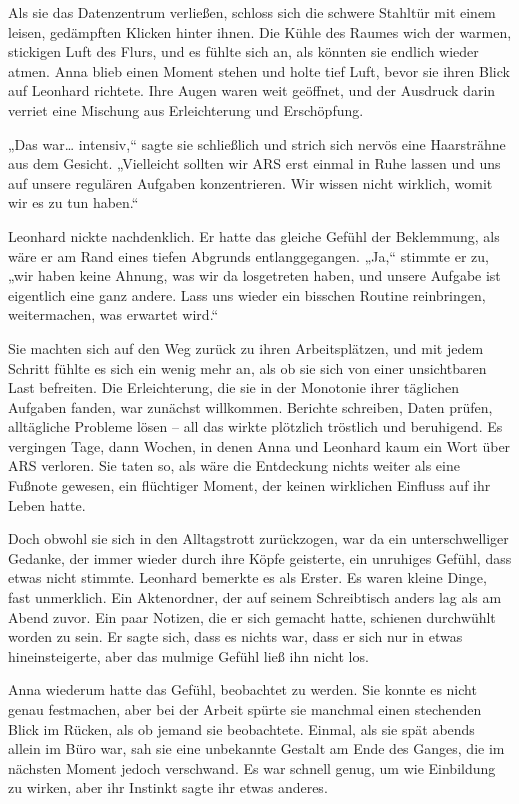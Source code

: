 \documentclass[
]{article}
\begin{document}
Als sie das Datenzentrum verließen, schloss sich die schwere Stahltür
mit einem leisen, gedämpften Klicken hinter ihnen. Die Kühle des Raumes
wich der warmen, stickigen Luft des Flurs, und es fühlte sich an, als
könnten sie endlich wieder atmen. Anna blieb einen Moment stehen und
holte tief Luft, bevor sie ihren Blick auf Leonhard richtete. Ihre Augen
waren weit geöffnet, und der Ausdruck darin verriet eine Mischung aus
Erleichterung und Erschöpfung.

„Das war\ldots{} intensiv,`` sagte sie schließlich und strich sich
nervös eine Haarsträhne aus dem Gesicht. „Vielleicht sollten wir ARS
erst einmal in Ruhe lassen und uns auf unsere regulären Aufgaben
konzentrieren. Wir wissen nicht wirklich, womit wir es zu tun haben.``

Leonhard nickte nachdenklich. Er hatte das gleiche Gefühl der
Beklemmung, als wäre er am Rand eines tiefen Abgrunds entlanggegangen.
„Ja,`` stimmte er zu, „wir haben keine Ahnung, was wir da losgetreten
haben, und unsere Aufgabe ist eigentlich eine ganz andere. Lass uns
wieder ein bisschen Routine reinbringen, weitermachen, was erwartet
wird.``

Sie machten sich auf den Weg zurück zu ihren Arbeitsplätzen, und mit
jedem Schritt fühlte es sich ein wenig mehr an, als ob sie sich von
einer unsichtbaren Last befreiten. Die Erleichterung, die sie in der
Monotonie ihrer täglichen Aufgaben fanden, war zunächst willkommen.
Berichte schreiben, Daten prüfen, alltägliche Probleme lösen -- all das
wirkte plötzlich tröstlich und beruhigend. Es vergingen Tage, dann
Wochen, in denen Anna und Leonhard kaum ein Wort über ARS verloren. Sie
taten so, als wäre die Entdeckung nichts weiter als eine Fußnote
gewesen, ein flüchtiger Moment, der keinen wirklichen Einfluss auf ihr
Leben hatte.

Doch obwohl sie sich in den Alltagstrott zurückzogen, war da ein
unterschwelliger Gedanke, der immer wieder durch ihre Köpfe geisterte,
ein unruhiges Gefühl, dass etwas nicht stimmte. Leonhard bemerkte es als
Erster. Es waren kleine Dinge, fast unmerklich. Ein Aktenordner, der auf
seinem Schreibtisch anders lag als am Abend zuvor. Ein paar Notizen, die
er sich gemacht hatte, schienen durchwühlt worden zu sein. Er sagte
sich, dass es nichts war, dass er sich nur in etwas hineinsteigerte,
aber das mulmige Gefühl ließ ihn nicht los.

Anna wiederum hatte das Gefühl, beobachtet zu werden. Sie konnte es
nicht genau festmachen, aber bei der Arbeit spürte sie manchmal einen
stechenden Blick im Rücken, als ob jemand sie beobachtete. Einmal, als
sie spät abends allein im Büro war, sah sie eine unbekannte Gestalt am
Ende des Ganges, die im nächsten Moment jedoch verschwand. Es war
schnell genug, um wie Einbildung zu wirken, aber ihr Instinkt sagte ihr
etwas anderes.
\end{document}
